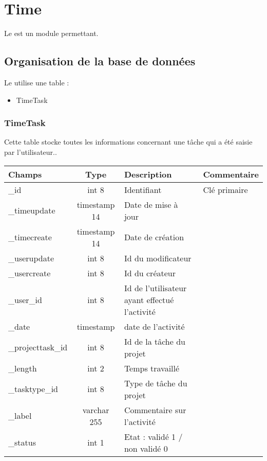
\clearpage
\section{Time}

Le \timemanager \obm  est un module permettant.

\subsection{Organisation de la base de données}

Le \timemanager utilise une table :
\begin{itemize}
 \item{TimeTask}
\end{itemize}

\subsubsection{TimeTask}
Cette table stocke toutes les informations concernant une tâche qui a été saisie par l'utilisateur..\\

\begin{tabular}{|p{3cm}|c|p{5.4cm}|p{2.6cm}|}
\hline
\textbf{Champs} & \textbf{Type} & \textbf{Description} & \textbf{Commentaire} \\
\hline
\_id & int 8 & Identifiant & Clé primaire \\
\hline
\_timeupdate & timestamp 14 & Date de mise à jour & \\
\hline
\_timecreate & timestamp 14 & Date de création & \\
\hline
\_userupdate & int 8 & Id du modificateur & \\
\hline
\_usercreate & int 8 & Id du créateur & \\
\hline
\_user\_id & int 8 & Id de l'utilisateur ayant effectué l'activité & \\
\hline
\_date & timestamp & date de l'activité & \\
\hline
\_projecttask\_id & int 8 & Id de la tâche du projet & \\
\hline
\_length & int 2 & Temps travaillé & \\
\hline
\_tasktype\_id & int 8 & Type de tâche du projet & \\
\hline
\_label & varchar 255 & Commentaire sur l'activité & \\
\hline
\_status & int 1 & Etat : validé 1 / non validé 0 & \\
\hline
\end{tabular}



